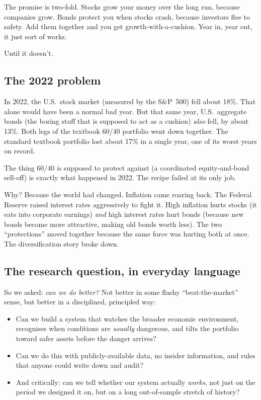 \documentclass[11pt]{article}
\begin{document}
The promise is two-fold. Stocks grow your money over the long run, because companies grow. Bonds protect you when stocks crash, because investors flee to safety. Add them together and you get growth-with-a-cushion. Year in, year out, it just sort of works.

Until it doesn't.

\subsection{The 2022 problem}

In 2022, the U.S.\ stock market (measured by the S\&P~500) fell about 18\%. That alone would have been a normal bad year. But that same year, U.S.\ aggregate bonds (the boring stuff that is supposed to act as a cushion) \emph{also} fell, by about 13\%. Both legs of the textbook 60/40 portfolio went down together. The standard textbook portfolio lost about 17\% in a single year, one of its worst years on record.

\begin{punchline}
\centering\large
The thing 60/40 is supposed to protect against (a coordinated equity-and-bond sell-off) is exactly what happened in 2022. The recipe failed at its only job.
\end{punchline}

Why? Because the world had changed. Inflation came roaring back. The Federal Reserve raised interest rates aggressively to fight it. High inflation hurts stocks (it eats into corporate earnings) \emph{and} high interest rates hurt bonds (because new bonds become more attractive, making old bonds worth less). The two ``protections'' moved together because the same force was hurting both at once. The diversification story broke down.

\subsection{The research question, in everyday language}

So we asked: \emph{can we do better?} Not better in some flashy ``beat-the-market'' sense, but better in a disciplined, principled way:

\begin{itemize}
  \item Can we build a system that watches the broader economic environment, recognises when conditions are \emph{usually} dangerous, and tilts the portfolio toward safer assets before the danger arrives?
  \item Can we do this with publicly-available data, no insider information, and rules that anyone could write down and audit?
  \item And critically: can we tell whether our system actually \emph{works}, not just on the period we designed it on, but on a long out-of-sample stretch of history?
\end{itemize}
\end{document}
